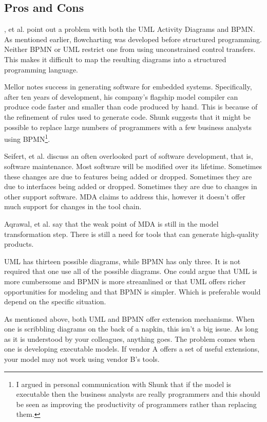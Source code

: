 \documentclass[10pt,journal,letterpaper,compsoc]{IEEEtran}
\begin{document}
\subsection{Pros and Cons}
, et al.\cite{Chun2006} point out a problem with both the UML Activity Diagrams and BPMN.  As mentioned earlier, flowcharting was developed before structured programming.  Neither BPMN or UML restrict one from using unconstrained control transfers.  This makes it difficult to map the resulting diagrams into a structured programming language.

Mellor\cite{Mellor2007} notes success in generating software for embedded systems.  Specifically, after ten years of development, his company's flagship model compiler can produce code faster and smaller than code produced by hand.  This is because of the refinement of rules used to generate code.  Shunk\cite{Shunk2008} suggests that it might be possible to replace large numbers of programmers with a few business analysts using BPMN\footnote{I argued in personal communication with Shunk that if the model is executable then the business analysts are really programmers and this should be seen as improving the productivity of programmers rather than replacing them.}.

Seifert, et al.\cite{Seifert2004} discuss an often overlooked part of software development, that is, software maintenance.  Most software will be modified over its lifetime.  Sometimes these changes are due to features being added or dropped.  Sometimes they are due to interfaces being added or dropped.  Sometimes they are due to changes in other support software.  MDA claims to address this, however it doesn't offer much support for changes in the tool chain.

Aqrawal, et al.\cite{agrawal2002} say that the weak point of MDA is still in the model transformation step.  There is still a need for tools that can generate high-quality products.

UML has thirteen possible diagrams\cite{Calliss2008}, while BPMN has only three\cite{BPMN20}.  It is not required that one use all of the possible diagrams.  One could argue that UML is more cumbersome and BPMN is more streamlined or that UML offers richer opportunities for modeling and that BPMN is simpler.  Which is preferable would depend on the specific situation.

As mentioned above, both UML and BPMN offer extension mechanisms.  When one is scribbling diagrams on the back of a napkin, this isn't a big issue.  As long as it is understood by your colleagues, anything goes.  The problem comes when one is developing executable models.  If vendor A offers a set of useful extensions, your model may not work using vendor B's tools.
\end{document}
